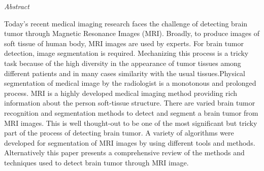 \documentclass[10pt, oneside]{Thesis} %
\begin{document}
 {\huge{\textit{Abstract}} \par}{ 

Today’s recent medical imaging research faces the challenge of detecting brain tumor through Magnetic Resonance Images (MRI). Broadly, to produce images of soft tissue of human body, MRI images are used by experts. For brain tumor detection, image segmentation is required. Mechanizing this process is a tricky task because of the high diversity in the appearance of tumor tissues among different patients and in many cases similarity with the usual tissues.Physical segmentation of medical image by the radiologist is a monotonous and prolonged process. MRI is a highly developed medical imaging method providing rich information about the person soft-tissue structure. There are varied brain tumor recognition and segmentation methods to detect and segment a brain tumor from MRI images. This is well thought-out to be one of the most significant but tricky part of the process of detecting brain tumor. A variety of algorithms were developed for segmentation of MRI images by using different tools and methods. Alternatively this paper presents a comprehensive review of the methods and techniques used to detect brain tumor through MRI image.  
%

\clearpage %



\clearpage %

}
\end{document}
